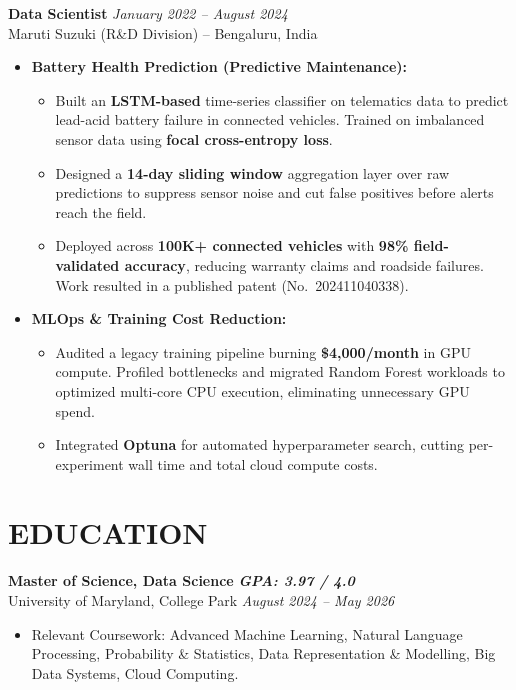 \documentclass[9pt]{article}
\begin{document}
\vspace{2pt}

\textbf{Data Scientist} \hfill \textit{January 2022 -- August 2024}\\
Maruti Suzuki (R\&D Division) -- Bengaluru, India
\begin{itemize}
    \item \textbf{Battery Health Prediction (Predictive Maintenance):}
    \begin{itemize}
        \item Built an \textbf{LSTM-based} time-series classifier on telematics data to predict lead-acid battery failure in connected vehicles. Trained on imbalanced sensor data using \textbf{focal cross-entropy loss}.
        \item Designed a \textbf{14-day sliding window} aggregation layer over raw predictions to suppress sensor noise and cut false positives before alerts reach the field.
        \item Deployed across \textbf{100K+ connected vehicles} with \textbf{98\% field-validated accuracy}, reducing warranty claims and roadside failures. Work resulted in a published patent (No.~202411040338).
    \end{itemize}
    \item \textbf{MLOps \& Training Cost Reduction:}
    \begin{itemize}
        \item Audited a legacy training pipeline burning \textbf{\$4,000/month} in GPU compute. Profiled bottlenecks and migrated Random Forest workloads to optimized multi-core CPU execution, eliminating unnecessary GPU spend.
        \item Integrated \textbf{Optuna} for automated hyperparameter search, cutting per-experiment wall time and total cloud compute costs.
    \end{itemize}
\end{itemize}

\vspace{3pt}
\section*{EDUCATION}

\textbf{Master of Science, Data Science} \hfill \textbf{\textit{GPA: 3.97 / 4.0}}\\
University of Maryland, College Park \hfill \textit{August 2024 -- May 2026}
\begin{itemize}
    \item Relevant Coursework: Advanced Machine Learning, Natural Language Processing, Probability \& Statistics, Data Representation \& Modelling, Big Data Systems, Cloud Computing.
\end{itemize}
\vspace{3pt}
\end{document}
